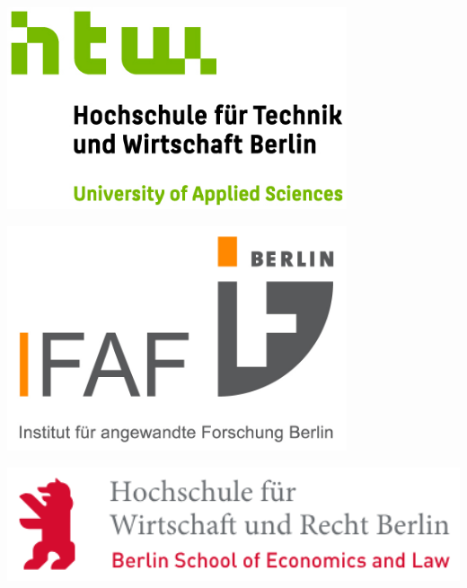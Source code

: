\documentclass[a0,portrait]{a0poster}
\begin{document}
\begin{multicols}{2}


\vspace{1cm}
\hrulefill
\vspace{1cm}
\printbibliography[heading=none]


\end{multicols}



\vspace{3cm}

\begin{minipage}[b]{0.33\linewidth}
\includegraphics[width=10cm,left]{htw_logo.jpg}
\end{minipage}
\begin{minipage}[b]{0.34\linewidth}
\includegraphics[width=10cm,center]{ifaf_logo.jpg}
\end{minipage}
\begin{minipage}[b]{0.33\linewidth}
\includegraphics[width=15cm,right]{hwr_logo.png}
\end{minipage}
\end{document}
